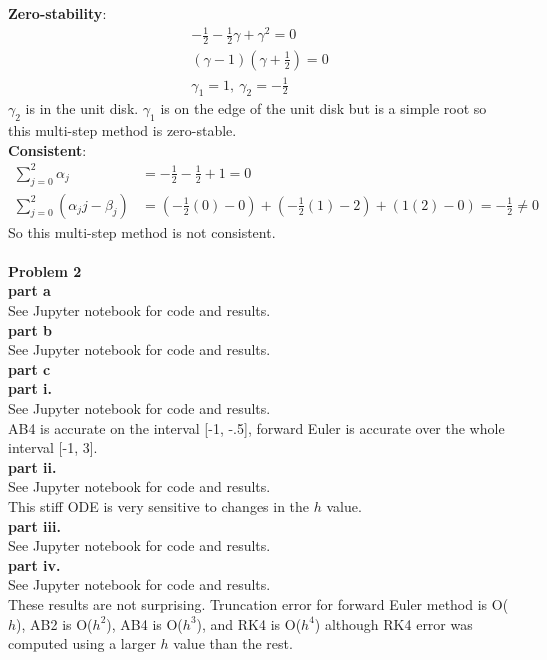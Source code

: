 \documentclass{article} %
\begin{document}
\textbf{Zero-stability}:
\begin{align*}
-\frac{1}{2} - \frac{1}{2} \gamma + \gamma^2 = 0 \\
(\gamma - 1)(\gamma + \frac{1}{2}) = 0 \\
\gamma_1 = 1, \: \gamma_2 = -\frac{1}{2}
\end{align*}
$\gamma_2$ is in the unit disk.  $\gamma_1$ is on the edge of the unit disk but is a simple root so this multi-step method is zero-stable. \\
\textbf{Consistent}: 
\begin{align*}
\sum_{j=0}^{2}\alpha_j &= -\frac{1}{2} -\frac{1}{2} + 1 = 0 \\
\sum_{j=0}^{2}(\alpha_j  j - \beta_j) &= (-\frac{1}{2}(0)-0) + (-\frac{1}{2}(1)-2)+(1(2)-0) = -\frac{1}{2}\neq 0
\end{align*}
So this multi-step method is not consistent. \\
\\


\textbf{Problem 2} \\
\textbf{part a} \\
See Jupyter notebook for code and results. \\

\textbf{part b} \\
See Jupyter notebook for code and results. \\

\textbf{part c} \\
\textbf{part i.} \\
See Jupyter notebook for code and results. \\
AB4 is accurate on the interval [-1, -.5], forward Euler is accurate over the whole interval [-1, 3]. \\
\textbf{part ii.} \\
See Jupyter notebook for code and results. \\
This stiff ODE is very sensitive to changes in the $h$ value. \\
\textbf{part iii.} \\
See Jupyter notebook for code and results. \\
\textbf{part iv.} \\
See Jupyter notebook for code and results. \\
These results are not surprising.  Truncation error for forward Euler method is O($h$), AB2 is O($h^2$), AB4 is O($h^3$), and RK4 is O($h^4$) although RK4 error was computed using a larger $h$ value than the rest. \\
\end{document}
